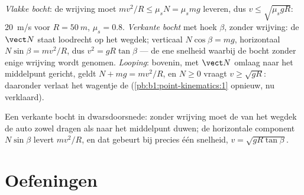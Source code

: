 \begin{example}\label{ex:b1:newton-dynamics:circles}
\emph{Vlakke bocht}: de wrijving moet $mv^2/R \leq \mu_sN = \mu_smg$ leveren,
dus $v \leq \sqrt{\mu_sgR}$: \qty{20}{m/s} voor $R = \qty{50}{m}$,
$\mu_s = 0.8$. \emph{Verkante bocht} met hoek $\beta$, zonder wrijving: de
 $\vect N$ staat loodrecht op het wegdek; verticaal $N\cos\beta = mg$,
horizontaal $N\sin\beta = mv^2/R$, dus $v^2 = gR\tan\beta$ --- de ene
snelheid waarbij de bocht zonder enige wrijving wordt genomen. \emph{Looping}: bovenin,
met $\vect N$ omlaag naar het middelpunt gericht, geldt $N + mg =
mv^2/R$, en $N \geq 0$ vraagt $v \geq \sqrt{gR}$: daaronder verlaat het wagentje
de  (\cref{pb:b1:point-kinematics:1} opnieuw, nu verklaard).
\end{example}

\begin{omfigure}

{\small Een verkante bocht in dwarsdoorsnede: zonder wrijving moet de
 van het wegdek de auto zowel dragen als naar
het middelpunt duwen; de horizontale component $N\sin\beta$ levert $mv^2/R$,
en dat gebeurt bij precies één snelheid, $v = \sqrt{gR\tan\beta}$.}
\end{omfigure}

\section{Oefeningen}

